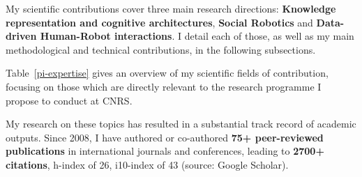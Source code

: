     \vspace{2em}
My scientific contributions cover three main research directions:
\textbf{Knowledge representation and cognitive architectures}, \textbf{Social
Robotics} and \textbf{Data-driven Human-Robot interactions}. I detail each of
those, as well as my main methodological and technical contributions, in the
following subsections.

Table~\ref{pi-expertise} gives an overview of my scientific fields of
contribution, focusing on those which are directly relevant to the research
programme I propose to conduct at CNRS.

My research on these topics has resulted in a substantial track record of
academic outputs.  Since 2008, I have authored or co-authored \textbf{75+
peer-reviewed publications} in international journals and conferences, leading
to \textbf{2700+ citations}, h-index of 26, i10-index of 43 (source: Google
Scholar).

